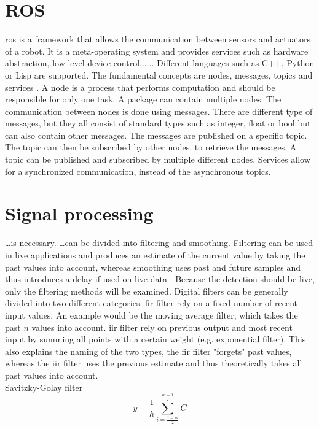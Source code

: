 \section{ROS}
\gls{ros} is a framework that allows the communication between sensors and actuators of a robot.
It is a meta-operating system and provides services such as hardware abstraction, low-level device control......
Different languages such as C++, Python or Lisp are supported.
The fundamental concepts are nodes, messages, topics and services \cite{Quigley2009}.
A node is a process that performs computation and should be responsible for only one task.
A package can contain multiple nodes.
The communication between nodes is done using messages.
There are different type of messages, but they all consist of standard types such as integer, float or bool but can also contain other messages.
The messages are published on a specific topic.
The topic can then be subscribed by other nodes, to retrieve the messages.
A topic can be published and subscribed by multiple different nodes.
Services allow for a synchronized communication, instead of the asynchronous topics.



\section{Signal processing}
\dots is necessary.
\dots can be divided into filtering and smoothing.
Filtering can be used in live applications and produces an estimate of the current value by taking the past values into account, whereas smoothing uses past and future samples and thus introduces a delay if used on live data .
Because the detection should be live, only the filtering methods will be examined.
Digital filters can be generally divided into two different categories.
\gls{fir} filter rely on a fixed number of recent input values. An example would be the moving average filter, which takes the past $n$ values into account.
\gls{iir} filter rely on previous output and most recent input by summing all points with a certain weight (e.g. exponential filter).
This also explains the naming of the two types, the \gls{fir} filter "forgets" past values, whereas the \gls{iir} filter uses the previous estimate and thus theoretically takes all past values into account.\\
Savitzky-Golay filter
\begin{equation}
    y = \frac{1}{h}\sum_{i =\frac{1 - m}{2}}^{\frac{m - 1}{2}}C
\end{equation}
